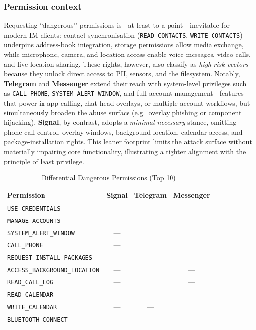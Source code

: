 \documentclass[a4paper,12pt]{report}
\newcommand{\cmark}{\ding{51}} %
\begin{document}
\subsubsection{Permission context}
Requesting “dangerous’’ permissions is—at least to a point—inevitable for
modern IM clients: contact synchronisation (\texttt{READ\_CONTACTS},
\texttt{WRITE\_CONTACTS}) underpins address-book integration, storage
permissions allow media exchange, while microphone, camera, and location
access enable voice messages, video calls, and live-location sharing.  These
rights, however, also classify as \emph{high-risk vectors} because they unlock
direct access to PII, sensors, and the filesystem.  Notably, \textbf{Telegram}
and \textbf{Messenger} extend their reach with system-level privileges such as
\texttt{CALL\_PHONE}, \texttt{SYSTEM\_ALERT\_WINDOW}, and full account
management—features that power in-app calling, chat-head overlays, or multiple
account workflows, but simultaneously broaden the abuse surface (e.g.\ overlay
phishing or component hijacking).  \textbf{Signal}, by contrast, adopts a
\emph{minimal-necessary} stance, omitting phone-call control, overlay windows,
background location, calendar access, and package-installation rights.  This
leaner footprint limits the attack surface without materially impairing core
functionality, illustrating a tighter alignment with the principle of least
privilege.
\begin{table}[htbp]
  \centering
  \caption{Differential Dangerous Permissions (Top 10)}
  \label{tab:differential-permissions}
  \setlength{\tabcolsep}{6pt}
  \begin{tabular}{@{}lccc@{}}
    \toprule
    \textbf{Permission}
        & \textbf{Signal}
        & \textbf{Telegram}
        & \textbf{Messenger} \\ \midrule
    \texttt{USE\_CREDENTIALS}           & \cmark & —      & — \\
    \texttt{MANAGE\_ACCOUNTS}           & —      & \cmark & \cmark \\
    \texttt{SYSTEM\_ALERT\_WINDOW}      & —      & \cmark & \cmark \\
    \texttt{CALL\_PHONE}                & —      & \cmark & \cmark \\
    \texttt{REQUEST\_INSTALL\_PACKAGES} & —      & \cmark & — \\
    \texttt{ACCESS\_BACKGROUND\_LOCATION} & —    & \cmark & — \\
    \texttt{READ\_CALL\_LOG}            & —      & \cmark & — \\
    \texttt{READ\_CALENDAR}             & —      & —      & \cmark \\
    \texttt{WRITE\_CALENDAR}            & —      & —      & \cmark \\
    \texttt{BLUETOOTH\_CONNECT}         & —      & \cmark & \cmark \\ \bottomrule
  \end{tabular}
\end{table}
\end{document}
